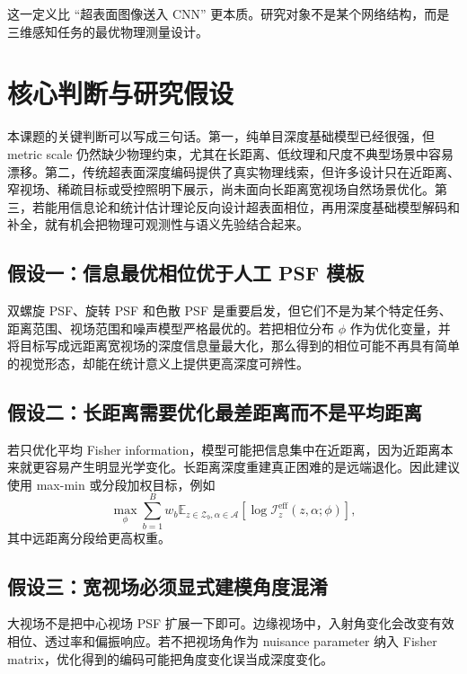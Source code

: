 \documentclass[11pt,a4paper,fontset=none]{ctexart}
\begin{document}
这一定义比 ``超表面图像送入 CNN'' 更本质。研究对象不是某个网络结构，而是三维感知任务的最优物理测量设计。

\section{核心判断与研究假设}

本课题的关键判断可以写成三句话。第一，纯单目深度基础模型已经很强，但 metric scale 仍然缺少物理约束，尤其在长距离、低纹理和尺度不典型场景中容易漂移。第二，传统超表面深度编码提供了真实物理线索，但许多设计只在近距离、窄视场、稀疏目标或受控照明下展示，尚未面向长距离宽视场自然场景优化。第三，若能用信息论和统计估计理论反向设计超表面相位，再用深度基础模型解码和补全，就有机会把物理可观测性与语义先验结合起来。

\subsection{假设一：信息最优相位优于人工 PSF 模板}

双螺旋 PSF、旋转 PSF 和色散 PSF 是重要启发，但它们不是为某个特定任务、距离范围、视场范围和噪声模型严格最优的。若把相位分布 $\phi$ 作为优化变量，并将目标写成远距离宽视场的深度信息量最大化，那么得到的相位可能不再具有简单的视觉形态，却能在统计意义上提供更高深度可辨性。

\subsection{假设二：长距离需要优化最差距离而不是平均距离}

若只优化平均 Fisher information，模型可能把信息集中在近距离，因为近距离本来就更容易产生明显光学变化。长距离深度重建真正困难的是远端退化。因此建议使用 max-min 或分段加权目标，例如
\begin{equation}
  \max_\phi
  \sum_{b=1}^{B} w_b
  \mathbb E_{z\in \mathcal Z_b,\alpha\in\mathcal A}
  \left[\log \mathcal I_z^{\mathrm{eff}}(z,\alpha;\phi)\right],
\end{equation}
其中远距离分段给更高权重。

\subsection{假设三：宽视场必须显式建模角度混淆}

大视场不是把中心视场 PSF 扩展一下即可。边缘视场中，入射角变化会改变有效相位、透过率和偏振响应。若不把视场角作为 nuisance parameter 纳入 Fisher matrix，优化得到的编码可能把角度变化误当成深度变化。
\end{document}
